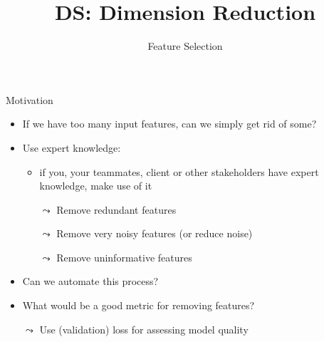 \documentclass[aspectratio=169]{../latex_main/tntbeamer}  %
\title[Feature Selection]{DS: Dimension Reduction}
\subtitle{Feature Selection}
\begin{document}
	
	\maketitle
	
    \begin{frame}[c]{Motivation}

    \begin{itemize}
        \item If we have too many input features, can we simply get rid of some?
        \item Use expert knowledge:
        \begin{itemize}
            \item if you, your teammates, client or other stakeholders have expert knowledge, make use of it
            \item[$\leadsto$] Remove redundant features
            \item[$\leadsto$] Remove very noisy features (or reduce noise)
            \item[$\leadsto$] Remove uninformative features
        \end{itemize}
        \pause
        \medskip
        \item Can we automate this process?
        \item What would be a good metric for removing features?
        \item[$\leadsto$] Use (validation) loss for assessing model quality
    \end{itemize}

	\end{frame}
	
\end{document}
